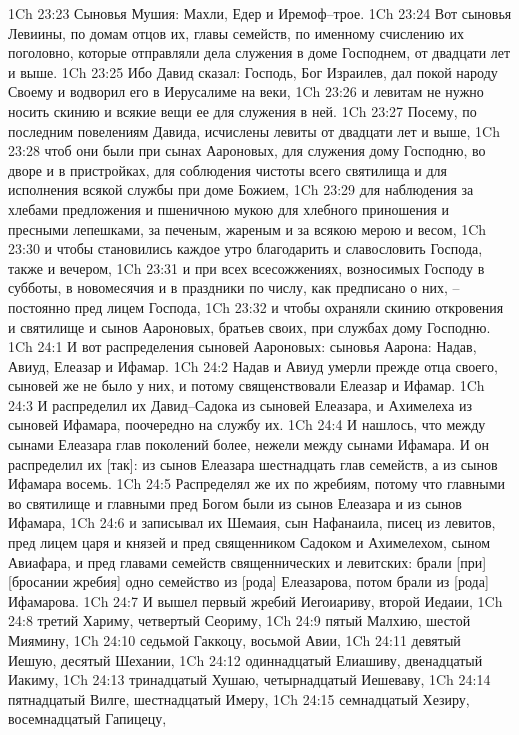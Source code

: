 1Ch 23:23  Сыновья Мушия: Махли, Едер и Иремоф--трое.
1Ch 23:24  Вот сыновья Левиины, по домам отцов их, главы семейств, по именному счислению их поголовно, которые отправляли дела служения в доме Господнем, от двадцати лет и выше.
1Ch 23:25  Ибо Давид сказал: Господь, Бог Израилев, дал покой народу Своему и водворил его в Иерусалиме на веки,
1Ch 23:26  и левитам не нужно носить скинию и всякие вещи ее для служения в ней.
1Ch 23:27  Посему, по последним повелениям Давида, исчислены левиты от двадцати лет и выше,
1Ch 23:28  чтоб они были при сынах Аароновых, для служения дому Господню, во дворе и в пристройках, для соблюдения чистоты всего святилища и для исполнения всякой службы при доме Божием,
1Ch 23:29  для наблюдения за хлебами предложения и пшеничною мукою для хлебного приношения и пресными лепешками, за печеным, жареным и за всякою мерою и весом,
1Ch 23:30  и чтобы становились каждое утро благодарить и славословить Господа, также и вечером,
1Ch 23:31  и при всех всесожжениях, возносимых Господу в субботы, в новомесячия и в праздники по числу, как предписано о них, --постоянно пред лицем Господа,
1Ch 23:32  и чтобы охраняли скинию откровения и святилище и сынов Аароновых, братьев своих, при службах дому Господню.
1Ch 24:1  И вот распределения сыновей Аароновых: сыновья Аарона: Надав, Авиуд, Елеазар и Ифамар.
1Ch 24:2  Надав и Авиуд умерли прежде отца своего, сыновей же не было у них, и потому священствовали Елеазар и Ифамар.
1Ch 24:3  И распределил их Давид--Садока из сыновей Елеазара, и Ахимелеха из сыновей Ифамара, поочередно на службу их.
1Ch 24:4  И нашлось, что между сынами Елеазара глав поколений более, нежели между сынами Ифамара. И он распределил их [так]: из сынов Елеазара шестнадцать глав семейств, а из сынов Ифамара восемь.
1Ch 24:5  Распределял же их по жребиям, потому что главными во святилище и главными пред Богом были из сынов Елеазара и из сынов Ифамара,
1Ch 24:6  и записывал их Шемаия, сын Нафанаила, писец из левитов, пред лицем царя и князей и пред священником Садоком и Ахимелехом, сыном Авиафара, и пред главами семейств священнических и левитских: брали [при] [бросании жребия] одно семейство из [рода] Елеазарова, потом брали из [рода] Ифамарова.
1Ch 24:7  И вышел первый жребий Иегоиариву, второй Иедаии,
1Ch 24:8  третий Хариму, четвертый Сеориму,
1Ch 24:9  пятый Малхию, шестой Миямину,
1Ch 24:10  седьмой Гаккоцу, восьмой Авии,
1Ch 24:11  девятый Иешую, десятый Шехании,
1Ch 24:12  одиннадцатый Елиашиву, двенадцатый Иакиму,
1Ch 24:13  тринадцатый Хушаю, четырнадцатый Иешеваву,
1Ch 24:14  пятнадцатый Вилге, шестнадцатый Имеру,
1Ch 24:15  семнадцатый Хезиру, восемнадцатый Гапицецу,
